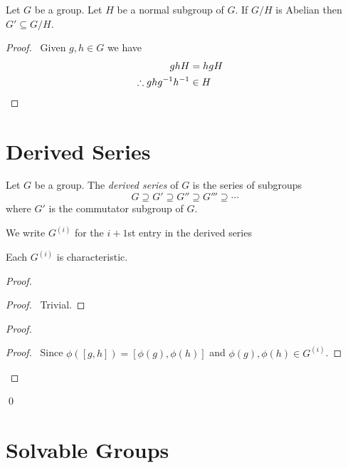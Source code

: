 \begin{lm}
\label{lm:GH-Abelian}
Let $G$ be a group. Let $H$ be a normal subgroup of $G$. If $G/H$ is Abelian then $G' \subseteq G/H$.
\end{lm}

\begin{proof}
\pf\ Given $g,h \in G$ we have
\begin{align*}
ghH & = hgH \\
\therefore gh{g}^{-1}{h}^{-1} & \in H & \relax
\end{align*}
\end{proof}

\section{Derived Series}

\begin{df}
Let $G$ be a group. The \emph{derived series} of $G$ is the series of subgroups
\[ G \supseteq G' \supseteq G'' \supseteq G''' \supseteq \cdots \]
where $G'$ is the commutator subgroup of $G$.

We write $G^{(i)}$ for the $i+1$st entry in the derived series
\end{df}

\begin{prop}
\label{prop:derived-group-characteristic}
Each $G^{(i)}$ is characteristic.
\end{prop}

\begin{proof}
\pf
{}
\begin{proof}
	\pf\ Trivial.
\end{proof}
\begin{proof}
	\begin{proof}
		\pf\ Since $\phi([g,h]) = [\phi(g),\phi(h)]$ and $\phi(g),\phi(h) \in G^{(i)}$.
	\end{proof}
\end{proof}
\qed
\end{proof}

\section{Solvable Groups}

